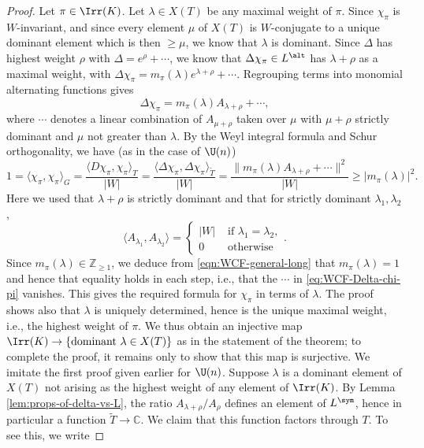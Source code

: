 \documentclass[reqno]{amsart} 
\begin{document}
\begin{proof}
  Let $\pi \in \Irr(K)$.  Let $\lambda \in X(T)$ be any maximal weight of $\pi$.  Since $\chi_\pi$ is $W$-invariant, and since every element $\mu$ of $X(T)$ is $W$-conjugate to a unique dominant element which is then $\geq \mu$, we know that $\lambda$ is dominant.  Since $\Delta$ has highest weight $\rho$ with $\Delta = e^\rho + \dotsb$, we know that $\Delta \chi_\pi \in L^{\alt}$ has $\lambda + \rho$ as a maximal weight, with $\Delta \chi_\pi = m_\pi(\lambda) e^{\lambda+\rho} + \dotsb$.  Regrouping terms into monomial alternating functions gives
  \begin{equation}\label{eq:WCF-Delta-chi-pi}
    \Delta \chi_\pi
    = m_\pi(\lambda) A_{\lambda+\rho} + \dotsb,
  \end{equation}
  where $\dotsb$ denotes a linear combination of $A_{\mu+\rho}$ taken over $\mu$ with $\mu+\rho$ strictly dominant and $\mu$ not greater than $\lambda$.  By the Weyl integral formula and Schur orthogonality, we have (as in the case of $\U(n)$)
  \begin{equation}\label{eqn:WCF-general-long}
    1 = \langle \chi_\pi, \chi_\pi  \rangle_G
    =
    \frac{\langle D \chi_\pi, \chi_\pi  \rangle_T}{|W|}
    =
    \frac{\langle \Delta \chi_\pi, \Delta \chi_\pi
      \rangle_{\tilde{T}}}  {|W|}
    =
    \frac{\|m_\pi(\lambda) A_{\lambda+\rho} + \dotsb \|^2}{|W|}
    \geq |m_\pi(\lambda)|^2.
  \end{equation}
  Here we used that $\lambda+\rho$ is strictly dominant and that for strictly dominant $\lambda_1, \lambda_2$,
  \begin{equation*}
    \langle A_{\lambda_1}, A_{\lambda_2} \rangle = 
\begin{cases}
      |W| & \text{ if } \lambda_1 = \lambda_2, \\
      0 & \text{ otherwise}
    \end{cases}
.
  \end{equation*}
  Since $m_\pi(\lambda) \in \mathbb{Z}_{\geq 1}$, we deduce from \eqref{eqn:WCF-general-long} that $m_\pi(\lambda) = 1$ and hence that equality holds in each step, i.e., that the $\dotsb$ in \eqref{eq:WCF-Delta-chi-pi} vanishes.  This gives the required formula for $\chi_\pi$ in terms of $\lambda$.  The proof shows also that $\lambda$ is uniquely determined, hence is the unique maximal weight, i.e., the highest weight of $\pi$.  We thus obtain an injective map $\Irr(K) \rightarrow \{\text{dominant } \lambda \in X(T)\}$ as in the statement of the theorem; to complete the proof, it remains only to show that this map is surjective.  We imitate the first proof given earlier for $\U(n)$.  Suppose $\lambda$ is a dominant element of $X(T)$ not arising as the highest weight of any element of $\Irr(K)$.  By Lemma \ref{lem:props-of-delta-vs-L}, the ratio $A_{\lambda+\rho}/A_{\rho}$ defines an element of $L^{\sym}$, hence in particular a function $\tilde{T} \rightarrow \mathbb{C}$.  We claim that this function factors through $T$.  To see this, we write

\end{proof}
\end{document}
